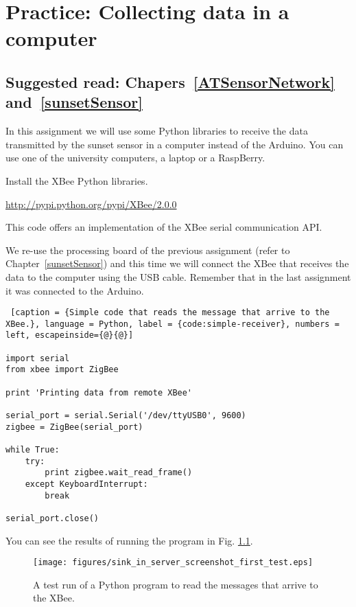 \chapter{Practice: Collecting data in a computer}
\section*{Suggested read: Chapers~\ref{ATSensorNetwork} and~\ref{sunsetSensor}}

In this assignment we will use some Python libraries to receive the data transmitted by the sunset sensor in a computer instead of the Arduino.
You can use one of the university computers, a laptop or a RaspBerry.

Install the XBee Python libraries.

\url{http://pypi.python.org/pypi/XBee/2.0.0}

This code offers an implementation of the XBee serial communication API.

We re-use the processing board of the previous assignment (refer to Chapter~\ref{sunsetSensor}) and this time we will connect the XBee that receives the data to the computer using the USB cable.
Remember that in the last assignment it was connected to the Arduino.

\begin{lstlisting} [caption = {Simple code that reads the message that arrive to the XBee.}, language = Python, label = {code:simple-receiver}, numbers = left, escapeinside={@}{@}]

import serial
from xbee import ZigBee

print 'Printing data from remote XBee'

serial_port = serial.Serial('/dev/ttyUSB0', 9600)
zigbee = ZigBee(serial_port)

while True:
    try:
        print zigbee.wait_read_frame()
    except KeyboardInterrupt:
        break

serial_port.close()
\end{lstlisting}

You can see the results of running the program in Fig. \ref{fig:sink_in_server_screenshot_first_test}.

\begin{figure}[htbp]
  \centering
  \texttt{[image: figures/sink\_in\_server\_screenshot\_first\_test.eps]}
  \caption{A test run of a Python program to read the messages that arrive to the XBee.}
  \label{fig:sink_in_server_screenshot_first_test}
\end{figure}

